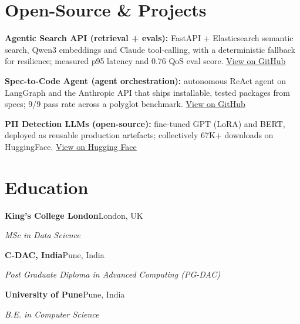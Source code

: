 \documentclass[10pt,a4paper]{article}
\begin{document}
\section{Open-Source \& Projects}
\begin{tight}
  \item \textbf{Agentic Search API (retrieval + evals):} FastAPI + Elasticsearch semantic search, Qwen3 embeddings and Claude tool-calling, with a deterministic fallback for resilience; measured p95 latency and 0.76 QoS eval score. \href{https://github.com/abhijeetscode/search-agent}{View on GitHub}
  \item \textbf{Spec-to-Code Agent (agent orchestration):} autonomous ReAct agent on LangGraph and the Anthropic API that ships installable, tested packages from specs; 9/9 pass rate across a polyglot benchmark. \href{https://github.com/abhijeetscode/Spec-to-Code-Agent}{View on GitHub}
  \item \textbf{PII Detection LLMs (open-source):} fine-tuned GPT (LoRA) and BERT, deployed as reusable production artefacts; collectively 67K+ downloads on HuggingFace. \href{https://huggingface.co/ab-ai/pii_model}{View on Hugging Face}
\end{tight}

\section{Education}
{\color{company}\bfseries King's College London}\hfill {\color{muted}London, UK}\par
{\itshape MSc in Data Science}\par\vspace{2pt}
{\color{company}\bfseries C-DAC, India}\hfill {\color{muted}Pune, India}\par
{\itshape Post Graduate Diploma in Advanced Computing (PG-DAC)}\par\vspace{2pt}
{\color{company}\bfseries University of Pune}\hfill {\color{muted}Pune, India}\par
{\itshape B.E. in Computer Science}\par
\end{document}
